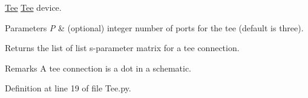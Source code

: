 \hyperlink{namespaceSignalIntegrity_1_1Devices_1_1Tee}{Tee} \hyperlink{namespaceSignalIntegrity_1_1Devices_1_1Tee}{Tee} device. 


\begin{DoxyParams}{Parameters}
{\em P} & (optional) integer number of ports for the tee (default is three). \\
\hline
\end{DoxyParams}
\begin{DoxyReturn}{Returns}
the list of list s-\/parameter matrix for a tee connection. 
\end{DoxyReturn}
\begin{DoxyRemark}{Remarks}
A tee connection is a dot in a schematic. 
\end{DoxyRemark}


Definition at line 19 of file Tee.\+py.

